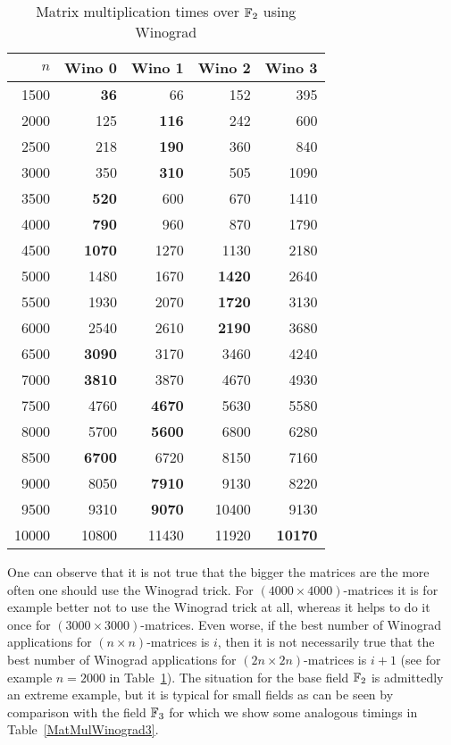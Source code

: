 \begin{table}[ht]
\begin{center}
\begin{tabular}{|r||r|r|r|r|}
\hline
$n$ & Wino 0 & Wino 1 & Wino 2 & Wino 3 \\
\hline
1500 & \textbf{36}     &66   & 152    &395      \\
2000 & 125    &\textbf{116}  & 242    &600      \\
2500 & 218    &\textbf{190}  & 360    &840      \\
3000 & 350    &\textbf{310}  & 505    &1090      \\
3500 & \textbf{520}    &600  & 670    &1410      \\
4000 & \textbf{790}    &960  & 870    &1790      \\
4500 & \textbf{1070}   &1270 & 1130   &2180      \\
5000 & 1480   &1670 & \textbf{1420}   &2640      \\
5500 & 1930   &2070 & \textbf{1720}   &3130      \\
6000 & 2540   &2610 & \textbf{2190}   &3680      \\
6500 & \textbf{3090}   &3170 & 3460   &4240      \\
7000 & \textbf{3810}   &3870 & 4670   &4930      \\
7500 & 4760   &\textbf{4670} & 5630   &5580      \\
8000 & 5700   &\textbf{5600} & 6800   &6280      \\
8500 & \textbf{6700}   &6720 & 8150   &7160      \\
9000 & 8050   &\textbf{7910} & 9130   &8220      \\
9500 & 9310   &\textbf{9070} & 10400  &9130      \\
10000 &10800  &11430&  11920 & \textbf{10170}     \\
\hline
\end{tabular}
\end{center}
\caption{Matrix multiplication times over $\mathbb{F}_2$ using Winograd}
\label{MatMulWinograd2}
%
\end{table}

One can observe that it is not true that the bigger the matrices are
the more often one should use the Winograd trick. For $(4000 \times
4000)$-matrices it is for example better not to use the Winograd trick
at all, whereas it helps to do it once for $(3000 \times
3000)$-matrices. Even worse, if the best number of
Winograd applications for $(n \times n)$-matrices is $i$, then it 
is not necessarily true that the best number of Winograd applications
for $(2n \times 2n)$-matrices is $i+1$ (see for example $n=2000$ in 
Table~\ref{MatMulWinograd2}). The situation for the base field 
$\mathbb{F}_2$ is admittedly an extreme example, but it is typical for small
fields as can be seen by comparison with the field $\mathbb{F}_3$ for which we
show some analogous timings in Table~\ref{MatMulWinograd3}.

